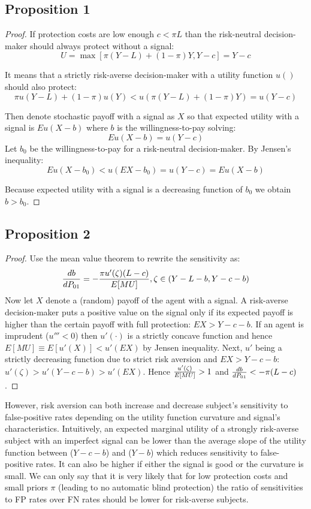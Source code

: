 \documentclass[12pt,a4paper]{article}
\begin{document}
\subsection{Proposition 1}
\begin{proof} If protection costs are low enough $c<\pi L$ than the risk-neutral decision-maker should always protect without a signal:
$$U=\max[\pi(Y-L)+(1-\pi)Y,Y-c]=Y-c$$

It means that a strictly risk-averse decision-maker with a utility function $u()$ should also protect:
$$\pi u(Y-L)+(1-\pi)u(Y)<u(\pi(Y-L)+(1-\pi)Y)=u(Y-c)$$

Then denote stochastic payoff with a signal as $X$ so that expected utility with a signal is $Eu(X-b)$ where $b$ is the willingness-to-pay solving:
$$Eu(X-b)=u(Y-c)$$
 Let $b_0$ be the willingness-to-pay for a risk-neutral decision-maker. By Jensen's inequality:
$$Eu(X-b_0)<u(EX-b_0)=u(Y-c)=Eu(X-b)$$

Because expected utility with a signal is a decreasing function of $b_0$ we obtain $b>b_0$. \end{proof} 

\subsection{Proposition 2}
\begin{proof}
Use the mean value theorem to rewrite the sensitivity as:
$${db\over dP_{01}}=-{\pi u'(\zeta)(L-c)\over E[MU]},\zeta \in \left(Y-L-b, Y-c-b\right)$$
Now let $X$ denote a (random) payoff of the agent with a signal. A risk-averse decision-maker puts a positive value on the signal only if its expected payoff is higher than the certain payoff with full protection: $EX>Y-c-b$. If an agent is imprudent ($u'''<0$) then $u'(\cdot)$ is a strictly concave function and hence $E[MU]\equiv E[u'(X)]<u'(EX)$ by Jensen inequality. Next, $u'$ being a strictly decreasing function due to strict risk aversion and $EX>Y-c-b$: $u'(\zeta)>u'(Y-c-b)>u'(EX)$. Hence ${u'(\zeta)\over E[MU]}>1$ and ${db\over dP_{01}}<-\pi(L-c)$. 
\end{proof}

However, risk aversion can both increase and decrease subject's sensitivity to false-positive rates depending on the utility function curvature and signal's characteristics. Intuitively, an expected marginal utility of a strongly risk-averse subject with an imperfect signal can be lower than the average slope of the utility function between ($Y-c-b$) and ($Y-b$) which reduces sensitivity to false-positive rates. It can also be higher if either the signal is good or the curvature is small. We can only say that it is very likely that for low protection costs and small priors $\pi$ (leading to no automatic blind protection) the ratio of sensitivities to FP rates over FN rates should be lower for risk-averse subjects. 
\end{document}
